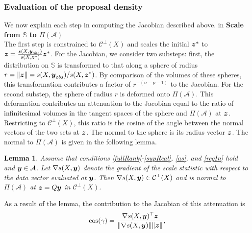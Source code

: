 \documentclass[ba]{imsart}
\newcommand{\by}{\mbox{\boldmath $y$}}
\newcommand{\bz}{\mbox{\boldmath $z$}}
\newcommand{\mc}{\mathcal}
\newtheorem{lemma}[theorem]{\bf Lemma}
\begin{document}
\subsubsection{Evaluation of the proposal density} 
We now explain each step in computing the Jacobian described above.
 in
\noindent
{\bf Scale from $\mathbb{S}$ to $\Pi(\mathcal{A})$} \\
The first step is constrained to $\mc{C}^\perp(X)$  and scales the initial $\bz^{*}$ to $\bz=\frac{s(X,\boldsymbol{y}_{obs})}{s(X, \boldsymbol{z}^{*})}\bz^{*}$. For the Jacobian, we consider two substeps: first, the distribution on  $\mathbb{S}$ is transformed to that along a sphere of radius $r=\|\bz\|={s(X,\boldsymbol{y}_{obs})}/{s(X, \boldsymbol{z}^{*})}$. By comparison of the volumes of these spheres, this transformation contributes a factor of $r^{-(n-p-1)}$ to the Jacobian. For the second substep, the sphere of radius $r$ is deformed onto $\Pi(\mathcal{A})$.  This deformation contributes an attenuation to the Jacobian equal to the ratio of infinitesimal volumes in the tangent spaces of the sphere and $\Pi(\mathcal{A})$ at $\bz$.  
Restricting to $\mc{C}^\perp(X)$, this ratio is the cosine of the angle between the normal 
vectors of the two sets at $\bz$.  The normal to the sphere is its radius vector $\bz$. The normal to
$\Pi(\mathcal{A})$ is given in the following lemma.  
\begin{lemma}
\label{gradSTheoremReg}
Assume that conditions \ref{fullRank}-\ref{supReal}, \ref{as}, and \ref{regIn} hold and $\by\in \mathcal{A}$. Let 
$\nabla s(X,\by)$ denote the
gradient of the scale statistic with respect to the data vector evaluated at
$\by$.  Then $\nabla s(X,\by)\in \mc{C}^\perp(X)$ and is 
normal to $\Pi(\mathcal{A})$ at $\bz=Q\by$  in $\mc{C}^\perp(X)$.
\end{lemma}
As a result of the lemma, the contribution to the  Jacobian of this attenuation is 
\begin{equation}
\label{cosine}
\cos(\gamma)=\frac{\nabla s(X,\by)^\top \bz}{\|\nabla
s(X,\by)\| \|\bz\|},
\end{equation}
\end{document}
